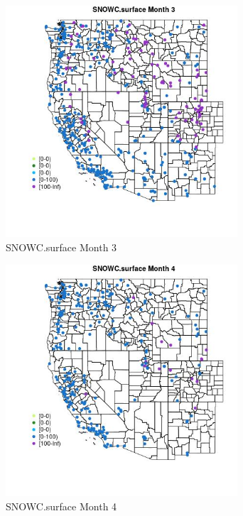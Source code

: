 \begin{figure} 
\centering  
\includegraphics[width=0.77\textwidth]{Code_Outputs/Report_ML_input_PM25_Step4_part_e_de_duplicated_aveswNAs_MapObsMo3SNOWCsurface.jpg} 
\caption{\label{fig:Report_ML_input_PM25_Step4_part_e_de_duplicated_aveswNAsMapObsMo3SNOWCsurface}SNOWC.surface Month 3} 
\end{figure} 
 

\clearpage 

\begin{figure} 
\centering  
\includegraphics[width=0.77\textwidth]{Code_Outputs/Report_ML_input_PM25_Step4_part_e_de_duplicated_aveswNAs_MapObsMo4SNOWCsurface.jpg} 
\caption{\label{fig:Report_ML_input_PM25_Step4_part_e_de_duplicated_aveswNAsMapObsMo4SNOWCsurface}SNOWC.surface Month 4} 
\end{figure} 
 

